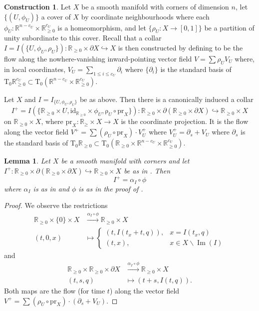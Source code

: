 \documentclass[11pt]{amsart}
\newcommand{\mrm}[1]{\mathrm{#1}}
\newcommand{\mbb}[1]{\mathbb{#1}}
\newcommand{\R}{\mbb{R}}
\DeclareMathOperator{\Imm}{Im}
\newcommand{\id}{\mathrm{id}}
\newcommand{\Tangent}{\mathrm{T}}
\numberwithin{equation}{section}
\theoremstyle{definition}
\newtheorem{construction}[equation]{Construction}
\theoremstyle{remark}
\theoremstyle{plain}
\newtheorem{lemma}[equation]{Lemma}
\begin{document}
\begin{construction}\label{O6BEXS3}
    Let $X$ be a smooth manifold with corners of dimension $n$, let $\{(U,\phi_U)\}$ a cover of $X$ by coordinate neighbourhoods where each $\phi_U\colon\R^{n-c_U}\times\R^{c_U}_{\geq0}$ is a homeomorphism, and let $\{\rho_U\colon X\to[0,1]\}$ be a partition of unity subordinate to this cover. Recall that a collar $I=I(\{U,\phi_U,\rho_U\})\colon \R_{\geq0}\times\partial X\hookrightarrow X$ is then constructed by defining to be the flow along the nowhere-vanishing inward-pointing vector field $V=\sum\rho_U V_U$ where, in local coordinates, $V_U=\sum_{1\leq i\leq c_U}\partial_i$ where $\{\partial_i\}$ is the standard basis of $\Tangent_0\R^{c_U}_{\geq0}\subset\Tangent_0(\R^{n-c_U}\times\R^{c_U}_{\geq0})$. 

    Let $X$ and $I=I_{\{U,\phi_U,\rho_U\}}$ be as above. Then there is a canonically induced a collar 
    \[
        I^+=I(\{\R_{\geq0}\times U,\id_{\R_{\geq0}}\times\phi_U,\mrm\rho_U\circ\mrm{pr}_X\})\colon \R_{\geq0}\times\partial(\R_{\geq0}\times\partial X)\hookrightarrow \R_{\geq0}\times X
    \] 
    on $\R_{\geq0}\times X$, where $\mrm{pr}_X\colon \R_{\geq}\times X\to X$ is the coordinate projection. It is the flow along the vector field $V^+=\sum(\rho_U\circ\mrm{pr}_X)\cdot V_U^+$ where $V_U^+=\partial_s+V_U$ where $\partial_s$ is the standard basis of $\Tangent_0\R_{\geq0}\subset\Tangent_0(\R_{\geq0}\times\R^{n-c_U}\times\R^{c_U}_{\geq0})$.
\end{construction}

\begin{lemma}\label{DYQ422D}
    Let $X$ be a smooth manifold with corners and let $I^+\colon\R_{\geq0}\times \partial(\R_{\geq0}\times\partial X)\hookrightarrow\R_{\geq0}\times X$ be as in . Then 
    \[
        I^+=\alpha_I\circ\phi
    \]
    where $\alpha_I$ is as in  and $\phi$ is as in the proof of .
\end{lemma}
\begin{proof}
    We observe the restrictions 
    \begin{align*}
        \R_{\geq0}\times\{0\}\times X&\xrightarrow{\alpha_I\circ\phi}\R_{\geq0}\times X\\
        (t,0,x)&\mapsto \begin{cases}
            (t,I(t_x+t,q)), & x=I(t_x,q)\\
            (t,x), & x\in X\smallsetminus\Imm(I)
        \end{cases}
    \end{align*}
    and
    \begin{align*}
        \R_{\geq0}\times\R_{\geq0}\times\partial X&\xrightarrow{\alpha_I\circ \phi} \R_{\geq0} \times X\\
        (t,s,q)&\mapsto (t+s,I(t,q)).
    \end{align*}
    Both maps are the flow (for time $t$) along the vector field $V^+=\sum(\rho_U\circ\mrm{pr}_X)\cdot(\partial_s+V_U)$.
\end{proof}
\end{document}
